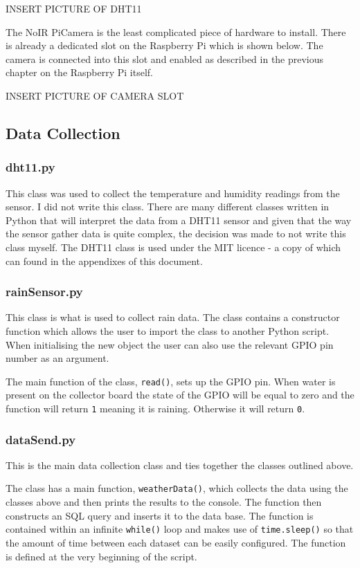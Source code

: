 \documentclass[10pt,a4paper]{article}
\begin{document}
INSERT PICTURE OF DHT11

The NoIR PiCamera is the least complicated piece of hardware to install. There is already a dedicated slot on the Raspberry Pi which is shown below. The camera is connected into this slot and enabled as described in the previous chapter on the Raspberry Pi itself. 

INSERT PICTURE OF CAMERA SLOT

\subsection{Data Collection}
\subsubsection{dht11.py}
This class was used to collect the temperature and humidity readings from the sensor. I did not write this class. There are many different classes written in Python that will interpret the data from a DHT11 sensor and given that the way the sensor gather data is quite complex, the decision was made to not write this class myself. The DHT11 class is used under the MIT licence - a copy of which can found in the appendixes of this document. 

\subsubsection{rainSensor.py}
This class is what is used to collect rain data. The class contains a constructor function which allows the user to import the class to another Python script. When initialising the new object the user can also use the relevant GPIO pin number as an argument. 

The main function of the class, \texttt{read()}, sets up the GPIO pin. When water is present on the collector board the state of the GPIO will be equal to zero and the function will return \texttt{1} meaning it is raining. Otherwise it will return \texttt{0}. 

\subsubsection{dataSend.py}
This is the main data collection class and ties together the classes outlined above. 

The class has a main function, \texttt{weatherData()}, which collects the data using the classes above and then prints the results to the console. The function then constructs an SQL query and inserts it to the data base. The function is contained within an infinite \texttt{while()} loop and makes use of  \texttt{time.sleep()} so that the amount of time between each dataset can be easily configured. The function is defined at the very beginning of the script. 
\end{document}
